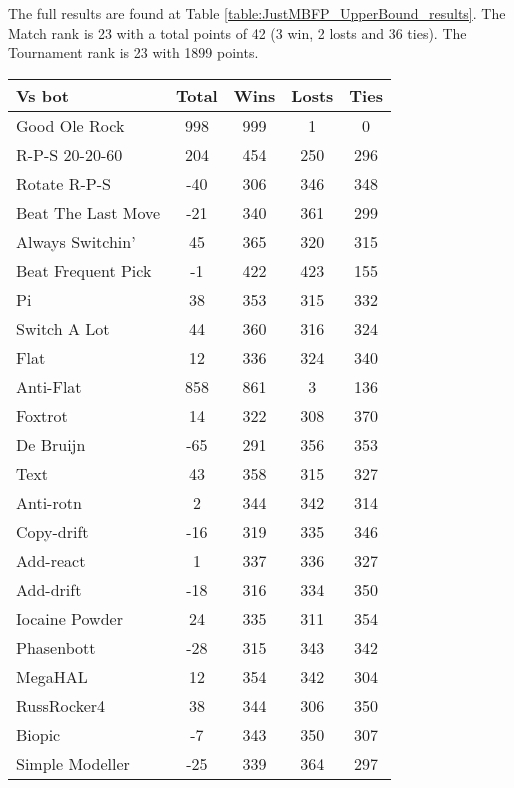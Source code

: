 The full results are found at Table \ref{table:JustMBFP_UpperBound_results}. The Match rank is 23 with a total points of 42 (3 win, 2 losts and 36 ties). The Tournament rank is 23 with 1899 points.

\begin{table*}
    \caption{MBFP\textsubscript{1} Upper Bound results}
    \label{table:JustMBFP_UpperBound_results}
    \centering
    \begin{tabular}{|l|c|c|c|c|}
        \hline
        \textbf{Vs bot} & \textbf{Total} & \textbf{Wins} & \textbf{Losts} & \textbf{Ties} \\ \hline
Good Ole Rock & 998 & 999 & 1 & 0 \\ \hline 
R-P-S 20-20-60 & 204 & 454 & 250 & 296 \\ \hline 
Rotate R-P-S & -40 & 306 & 346 & 348 \\ \hline 
Beat The Last Move & -21 & 340 & 361 & 299 \\ \hline 
Always Switchin' & 45 & 365 & 320 & 315 \\ \hline 
Beat Frequent Pick & -1 & 422 & 423 & 155 \\ \hline 
Pi & 38 & 353 & 315 & 332 \\ \hline 
Switch A Lot & 44 & 360 & 316 & 324 \\ \hline 
Flat & 12 & 336 & 324 & 340 \\ \hline 
Anti-Flat & 858 & 861 & 3 & 136 \\ \hline 
Foxtrot & 14 & 322 & 308 & 370 \\ \hline 
De Bruijn & -65 & 291 & 356 & 353 \\ \hline 
Text & 43 & 358 & 315 & 327 \\ \hline 
Anti-rotn & 2 & 344 & 342 & 314 \\ \hline 
Copy-drift & -16 & 319 & 335 & 346 \\ \hline 
Add-react & 1 & 337 & 336 & 327 \\ \hline 
Add-drift & -18 & 316 & 334 & 350 \\ \hline 
Iocaine Powder & 24 & 335 & 311 & 354 \\ \hline 
Phasenbott & -28 & 315 & 343 & 342 \\ \hline 
MegaHAL & 12 & 354 & 342 & 304 \\ \hline 
RussRocker4 & 38 & 344 & 306 & 350 \\ \hline 
Biopic & -7 & 343 & 350 & 307 \\ \hline 
Simple Modeller & -25 & 339 & 364 & 297 \\ \hline 

\end{tabular}
\end{table*}
